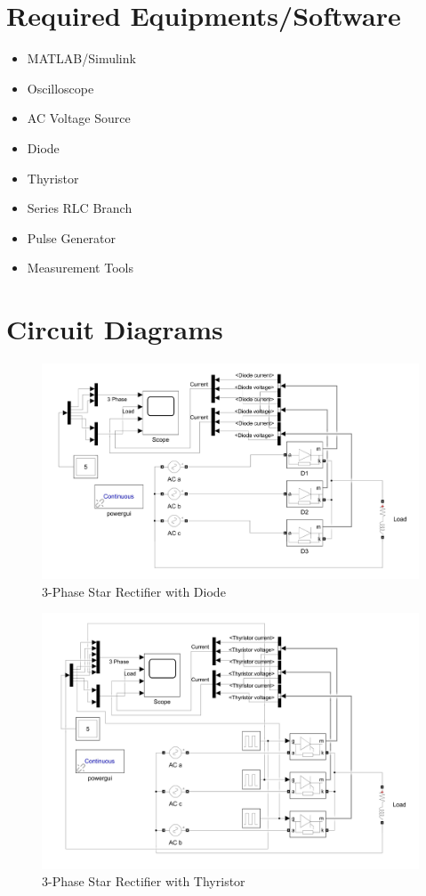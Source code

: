 \documentclass[12pt]{article}
\begin{document}
\section*{Required Equipments/Software}
\begin{itemize}
    \item MATLAB/Simulink
    \item Oscilloscope
    \item AC Voltage Source
    \item Diode
    \item Thyristor
    \item Series RLC Branch
    \item Pulse Generator
    \item Measurement Tools
\end{itemize}

\section*{Circuit Diagrams}
\begin{figure}[H]
    \centering
    \includegraphics[width=\textwidth]{ckt.png}
    \caption{3-Phase Star Rectifier with Diode}
    \label{fig:d_load}
\end{figure}

\begin{figure}[H]
    \centering
    \includegraphics[width=\textwidth]{ckt2.png}
    \caption{3-Phase Star Rectifier with Thyristor}
    \label{fig:t_load}
\end{figure}
\end{document}
